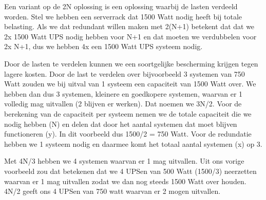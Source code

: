 Een variant op de 2N oplossing is een oplossing waarbij de lasten verdeeld worden. Stel we hebben een serverrack dat 1500 Watt nodig heeft bij totale belasting. Als we dat redundant willen maken met 2(N+1) betekent dat dat we 2x 1500 Watt UPS nodig hebben voor N+1 en dat moeten we verdubbelen voor 2x N+1, dus we hebben 4x een 1500 Watt UPS systeem nodig.

Door de lasten te verdelen kunnen we een soortgelijke bescherming krijgen tegen lagere kosten. Door de last te verdelen over bijvoorbeeld 3 systemen van 750 Watt zouden we bij uitval van 1 systeem een capaciteit van 1500 Watt over. We hebben dan dus 3 systemen, kleinere en goedkopere systemen, waarvan er 1 volledig mag uitvallen (2 blijven er werken). Dat noemen we 3N/2. Voor de berekening van de capaciteit per systeem nemen we de totale capaciteit die we nodig hebben (N) en delen dat door het aantal systemen dat moet blijven functioneren (y). In dit voorbeeld dus 1500/2 = 750 Watt. Voor de redundatie hebben we 1 systeem nodig en daarmee komt het totaal aantal systemen (x) op 3.

Met 4N/3 hebben we 4 systemen waarvan er 1 mag uitvallen. Uit ons vorige voorbeeld zou dat betekenen dat we 4 UPSen van 500 Watt (1500/3) neerzetten waarvan er 1 mag uitvallen zodat we dan nog steeds 1500 Watt over houden. 4N/2 geeft ons 4 UPSen van 750 watt waarvan er 2 mogen uitvallen.
